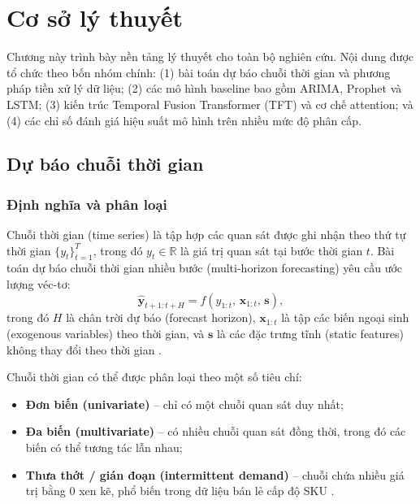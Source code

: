 
\chapter{Cơ sở lý thuyết}
\label{chap:co_so_ly_thuyet}

Chương này trình bày nền tảng lý thuyết cho toàn bộ nghiên cứu. Nội dung được tổ chức theo bốn nhóm chính: (1) bài toán dự báo chuỗi thời gian và phương pháp tiền xử lý dữ liệu; (2) các mô hình baseline bao gồm ARIMA, Prophet và LSTM; (3) kiến trúc Temporal Fusion Transformer (TFT) và cơ chế attention; và (4) các chỉ số đánh giá hiệu suất mô hình trên nhiều mức độ phân cấp.

\section{Dự báo chuỗi thời gian}
\label{sec:du_bao_chuoi_thoi_gian}

\subsection{Định nghĩa và phân loại}
\label{subsec:dinh_nghia}

Chuỗi thời gian (time series) là tập hợp các quan sát được ghi nhận theo thứ tự thời gian $\{y_t\}_{t=1}^{T}$, trong đó $y_t \in \mathbb{R}$ là giá trị quan sát tại bước thời gian $t$. Bài toán dự báo chuỗi thời gian nhiều bước (multi-horizon forecasting) yêu cầu ước lượng véc-tơ:
\begin{equation}
    \hat{\mathbf{y}}_{t+1:t+H} = f\!\left(y_{1:t},\, \mathbf{x}_{1:t},\, \mathbf{s}\right),
    \label{eq:du_bao_chung}
\end{equation}
trong đó $H$ là chân trời dự báo (forecast horizon), $\mathbf{x}_{1:t}$ là tập các biến ngoại sinh (exogenous variables) theo thời gian, và $\mathbf{s}$ là các đặc trưng tĩnh (static features) không thay đổi theo thời gian \citep{hyndman2018forecasting}.

Chuỗi thời gian có thể được phân loại theo một số tiêu chí:
\begin{itemize}
    \item \textbf{Đơn biến (univariate)} -- chỉ có một chuỗi quan sát duy nhất;
    \item \textbf{Đa biến (multivariate)} -- có nhiều chuỗi quan sát đồng thời, trong đó các biến có thể tương tác lẫn nhau;
    \item \textbf{Thưa thớt / gián đoạn (intermittent demand)} -- chuỗi chứa nhiều giá trị bằng 0 xen kẽ, phổ biến trong dữ liệu bán lẻ cấp độ SKU \citep{syntetos2005accuracy}.
\end{itemize}

